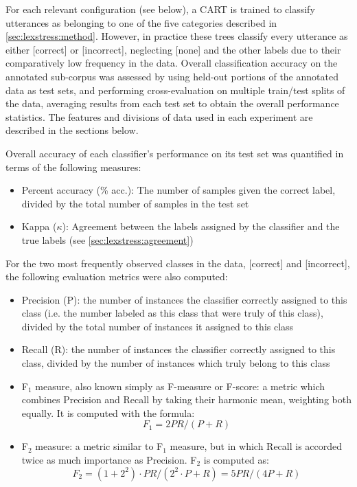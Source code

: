 		For each relevant configuration (see below), a CART is trained to classify utterances as belonging to one of the five categories described in \cref{sec:lexstress:method}. However, in practice these trees classify every utterance as either [correct] or [incorrect], neglecting [none] and the other labels due to their comparatively low frequency in the data.
		Overall classification accuracy on the annotated sub-corpus was assessed by using held-out portions of the annotated data as test sets, and performing cross-evaluation on multiple train/test splits of the data, averaging results from each test set to obtain the overall performance statistics. The features and divisions of data used in each experiment are described in the sections below. 


	Overall accuracy of each classifier's performance on its test set was quantified in terms of the following measures:
		\begin{itemize}
		\item{Percent accuracy (\% acc.): The number of samples given the correct label, divided by the total number of samples in the test set}
		\item{Kappa ($\kappa$): Agreement between the labels assigned by the classifier and the true labels 
		(see \cref{sec:lexstress:agreement})}
		\end{itemize}
For the two most frequently observed classes in the data, [correct] and [incorrect], the following evaluation metrics were also computed:
			\begin{itemize}
			\item{Precision (P): the number of instances the classifier correctly assigned to this class (i.e. the number labeled as this class that were truly of this class), divided by the total number of instances it assigned to this class}
			\item{Recall (R): the number of instances the classifier correctly assigned to this class, divided by the number of instances which truly belong to this class}
			\item{F$_1$ measure, also known simply as F-measure or F-score: a metric which combines Precision and Recall by taking their harmonic mean, weighting both equally. It is computed with the formula:
			\[F_1 = 2PR/(P+R)\]
			}
			\item{F$_2$ measure: a metric similar to F$_1$ measure, but in which Recall is accorded twice as much importance as Precision. F$_2$ is computed as:
			\[F_2 = (1+2^2) \cdot PR/(2^2 \cdot P+R) = 5PR/(4P+R)\]
			}
			
			\end{itemize}
